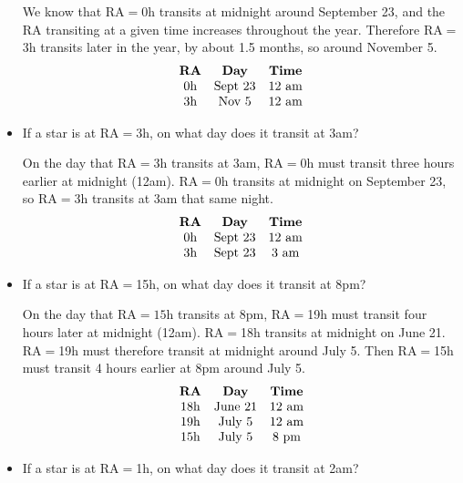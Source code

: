 \documentclass[12pt, preprint]{aastex}
\begin{document}
\begin{itemize}
  \begin{answer}
    We know that RA$=$0h transits at midnight around September 23, and
    the RA transiting at a given time increases throughout the year.
    Therefore RA$=$3h transits later in the year, by about 1.5 months,
    so around November 5.
    \begin{equation}
    \begin{array}{ccc}
      \mbox{\bf RA} & \mbox{\bf Day} & \mbox{\bf Time} \cr
      \mbox{0h} & \mbox{Sept 23} & \mbox{12 am}\cr
      \mbox{3h} & \mbox{Nov 5}  & \mbox{12 am}\cr
    \end{array}
    \end{equation}
  \end{answer}
\item If a star is at RA$=$3h, on what day does it transit at 3am?

  \begin{answer}
    On the day that RA$=$3h transits at 3am, RA$=$0h must transit
    three hours earlier at midnight (12am). RA$=$0h transits at
    midnight on September 23, so RA$=$3h transits at 3am that same
    night.
    \begin{equation}
    \begin{array}{ccc}
      \mbox{\bf RA} & \mbox{\bf Day} & \mbox{\bf Time} \cr
      \mbox{0h} & \mbox{Sept 23} & \mbox{12 am}\cr
      \mbox{3h} & \mbox{Sept 23}  & \mbox{3 am}\cr
    \end{array}
    \end{equation}
  \end{answer}
\item If a star is at RA$=$15h, on what day does it transit at 8pm?

  \begin{answer}
    On the day that RA$=15$h transits at 8pm, RA$=$19h must transit
    four hours later at midnight (12am). RA$=$18h transits at
    midnight on June 21. RA$=$19h must therefore transit at
    midnight around July 5. Then RA$=$15h must transit 4 hours earlier
    at 8pm around July 5.
    \begin{equation}
    \begin{array}{ccc}
      \mbox{\bf RA} & \mbox{\bf Day} & \mbox{\bf Time} \cr
      \mbox{18h} & \mbox{June 21} & \mbox{12 am}\cr
      \mbox{19h} & \mbox{July 5}  & \mbox{12 am}\cr
      \mbox{15h} & \mbox{July 5}  & \mbox{8 pm}\cr
    \end{array}
    \end{equation}
  \end{answer}
\item If a star is at RA$=$1h, on what day does it transit at 2am?


\end{itemize}
\end{document}
